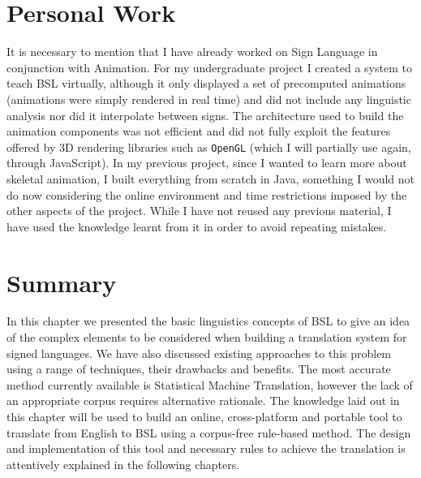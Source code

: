 \documentclass[12pt]{ociamthesis}  %
\newcommand{\tech}{\texttt}
\begin{document}
\section{Personal Work}
It is necessary to mention that I have already worked on Sign Language in conjunction with  Animation. For my undergraduate project I created a system to teach BSL virtually, although it only displayed a set of precomputed animations (animations were simply rendered in real time) and did not include any linguistic analysis nor did it interpolate between signs. The architecture used to build the animation components was not efficient and did not fully exploit the features offered by 3D rendering libraries such as \tech{OpenGL} (which I will partially use again, through JavaScript). In my previous project, since I wanted to learn more about skeletal animation, I built everything from scratch in Java, something I would not do now considering the online environment and time restrictions imposed by the other aspects of the project. While I have not reused any previous material, I have used the knowledge learnt from it in order to avoid repeating mistakes.
\section{Summary}
In this chapter we presented the basic linguistics concepts of BSL to give an idea of the complex elements to be considered when building a translation system for signed languages. We have also discussed existing approaches to this problem using a range of techniques, their drawbacks and benefits. The most accurate method currently available is Statistical Machine Translation, however the lack of an appropriate corpus requires alternative rationale. The knowledge laid out in this chapter will be used to build an online, cross-platform and portable tool to translate from English to BSL using a corpus-free rule-based method. The design and implementation of this tool and necessary rules to achieve the translation is attentively explained in the following chapters.

\end{document}
